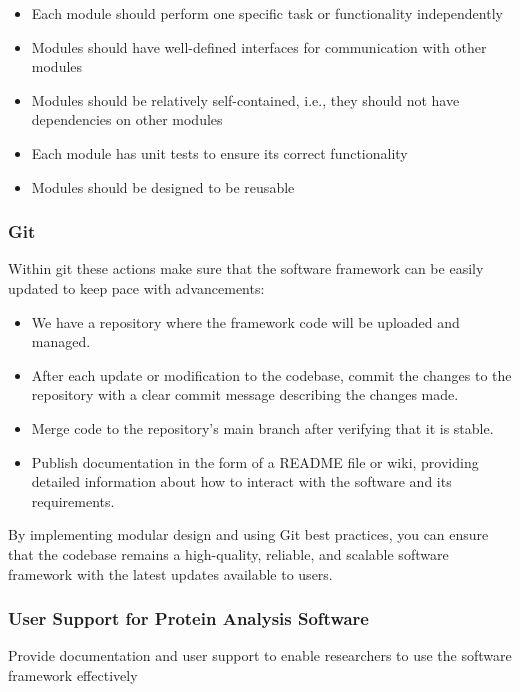 \documentclass[]{final_report}
\begin{document}
\begin{itemize}
    \item Each module should perform one specific task or functionality independently
    \item Modules should have well-defined interfaces for communication with other modules
    \item Modules should be relatively self-contained, i.e., they should not have dependencies on other modules
    \item Each module has unit tests to ensure its correct functionality
    \item Modules should be designed to be reusable
\end{itemize}


\subsubsection{Git}
Within git these actions make sure that the software framework can be easily updated to keep pace with advancements:

\begin{itemize}
    \item We have a repository where the framework code will be uploaded and managed.
    \item After each update or modification to the codebase, commit the changes to the repository with a clear commit message describing the changes made.
    \item Merge code to the repository's main branch after verifying that it is stable.
    \item Publish documentation in the form of a README file or wiki, providing detailed information about how to interact with the software and its requirements.
\end{itemize}

By implementing modular design and using Git best practices, you can ensure that the codebase remains a high-quality, reliable, and scalable software framework with the latest updates available to users.

\clearpage

\subsubsection{User Support for Protein Analysis Software}
\begin{displayquote}
    Provide documentation and user support to enable researchers to use the software
    framework effectively
\end{displayquote}
\end{document}
